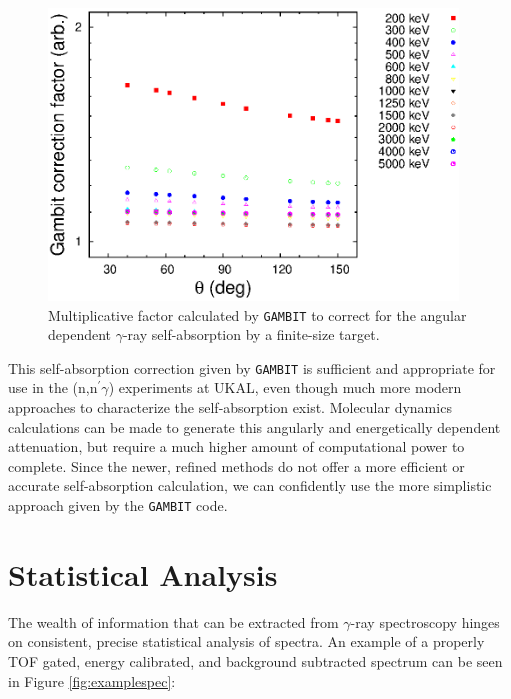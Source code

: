 \begin{figure}[ht]
\begin{center}
\includegraphics[width=0.97\textwidth]{figures/gambit.eps}
\caption{Multiplicative factor calculated by {\tt GAMBIT} to correct for the angular dependent $\gamma$-ray self-absorption by a finite-size target. \label{fig:gambit}}
\end{center}
\end{figure}

This self-absorption correction given by {\tt GAMBIT} is sufficient and appropriate for use in the (n,n$^\prime\gamma$) experiments at UKAL, even though much more modern approaches to characterize the self-absorption exist. Molecular dynamics calculations can be made to generate this angularly and energetically dependent attenuation, but require a much higher amount of computational power to complete. Since the newer, refined methods do not offer a more efficient or accurate self-absorption calculation, we can confidently use the more simplistic approach given by the {\tt GAMBIT} code.

\section{Statistical Analysis}
The wealth of information that can be extracted from $\gamma$-ray spectroscopy hinges on consistent, precise statistical analysis of spectra. An example of a properly TOF gated, energy calibrated, and background subtracted spectrum can be seen in Figure \ref{fig:examplespec}:

